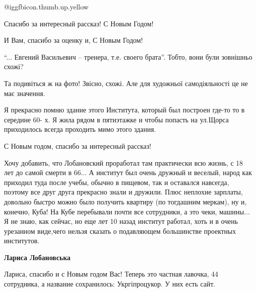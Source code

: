  
 
 
 
 
\zzSecCmt

\begin{itemize} %
 @igg{fbicon.thumb.up.yellow} 


Спасибо за интересный рассказ! С Новым Годом!


И Вам, спасибо за оценку и, С Новым Годом!

\enquote{... Евгений Васильевич – тренера, т.е. своего брата}. Тобто, вони були зовнішньо схожі?


Та подивіться ж на фото! Звісно, схожі. Але для художньої самодіяльності це не
має значення.


Я прекрасно помню здание этого Института, который был построен где-то то в
середине 60- х. Я жила рядом в пятиэтажке и чтобы попасть на ул.Щорса
приходилось всегда проходить мимо этого здания.

С Новым годом, спасибо за интересный рассказ!


Хочу добавить, что Лобановский проработал там практически всю жизнь, с 18 лет
до самой смерти в 66... А институт был очень дружный и веселый, народ как
приходил туда после учебы, обычно в пищевом, так и оставался навсегда, поэтому
все друг друга прекрасно знали и дружили. Плюс неплохие зарплаты, довольно
быстро можно было получить квартиру (по тогдашним меркам), ну и, конечно, Куба!
На Кубе перебывали почти все сотрудники, а это чеки, машины... Я не знаю, как
сейчас, но еще лет 10 назад институт работал, хоть и в очень урезанном
виде,чего нельзя сказать о подавляющем большинстве проектных институтов.

\begin{itemize} %
\textbf{Лариса Лобановська} 

Лариса, спасибо и с Новым годом Вас! Теперь это частная лавочка, 44 сотрудника,
а название сохранилось: Укргіпроцукор. У них есть сайт.


\end{itemize}
\end{itemize}
